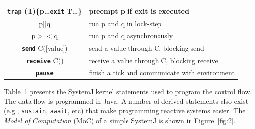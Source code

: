 \begin{table}[tb]
\begin{minipage}{8cm}
\begin{small}
\begin{tabular}{|c|p{80pt}|}
     \textbf{\texttt{trap}} (T)\{p\ldots \textbf{\texttt{exit}} T\ldots\} & preempt p if exit is executed\\                         
     \hline                                                                                     
     p\textbf{\texttt{$||$}}q & run p and q in lock-step\\                                                        
     \hline                                                                                     
     p$><$q & run p and q asynchronously\\                                                      
     \hline                                                                                     
     \textbf{\texttt{send}} C([value]) & send a value through C, blocking
     send\\                                                 
     \hline                                                                                     
     \textbf{\texttt{receive}} C() & receive a value through C, blocking
     receive\\
     \hline                                                                                     
     \textbf{\texttt{pause}} & finish a tick and communicate
     with environment\\
     \hline                                                                                     
   \end{tabular}
  \end{small}
 \end{minipage}
 \label{tab:1}
\end{table}

Table~\ref{tab:1} presents the SystemJ kernel statements used to program
the control flow. The data-flow is programmed in Java. A number of
derived statements also exist (e.g., \texttt{sustain}, \texttt{await},
etc) that make programming reactive systems easier. The \textit{Model of
  Computation} (MoC) of a simple SystemJ is shown in Figure~\ref{fig:2}.

